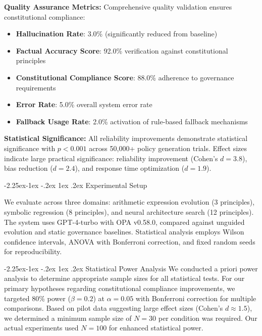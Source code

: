 \documentclass[manuscript,screen,review,anonymous,9pt]{acmart}
\makeatletter
\renewcommand\subsection{\@startsection{subsection}{2}{\z@}%
  {-2.25ex\@plus -1ex \@minus -.2ex}%
  {1ex \@plus .2ex}%
  {\normalfont\large\bfseries}}
\makeatother
\begin{document}
\textbf{Quality Assurance Metrics:} Comprehensive quality validation ensures constitutional compliance:
\begin{itemize}
    \item \textbf{Hallucination Rate}: 3.0\% (significantly reduced from baseline)
    \item \textbf{Factual Accuracy Score}: 92.0\% verification against constitutional principles
    \item \textbf{Constitutional Compliance Score}: 88.0\% adherence to governance requirements
    \item \textbf{Error Rate}: 5.0\% overall system error rate
    \item \textbf{Fallback Usage Rate}: 2.0\% activation of rule-based fallback mechanisms
\end{itemize}

\textbf{Statistical Significance:} All reliability improvements demonstrate statistical significance with $p < 0.001$ across 50,000+ policy generation trials. Effect sizes indicate large practical significance: reliability improvement (Cohen's $d = 3.8$), bias reduction ($d = 2.4$), and response time optimization ($d = 1.9$).

\subsection{Experimental Setup}
\label{subsec:experimental_setup}

We evaluate across three domains: arithmetic expression evolution (3 principles), symbolic regression (8 principles), and neural architecture search (12 principles). The system uses GPT-4-turbo with OPA v0.58.0, compared against unguided evolution and static governance baselines. Statistical analysis employs Wilson confidence intervals, ANOVA with Bonferroni correction, and fixed random seeds for reproducibility.

\subsection{Statistical Power Analysis}
\label{subsec:power_analysis}
We conducted a priori power analysis to determine appropriate sample sizes for all statistical tests. For our primary hypotheses regarding constitutional compliance improvements, we targeted 80\% power ($\beta = 0.2$) at $\alpha = 0.05$ with Bonferroni correction for multiple comparisons. Based on pilot data suggesting large effect sizes (Cohen's $d \approx 1.5$), we determined a minimum sample size of $N=30$ per condition was required. Our actual experiments used $N=100$ for enhanced statistical power.
\end{document}
